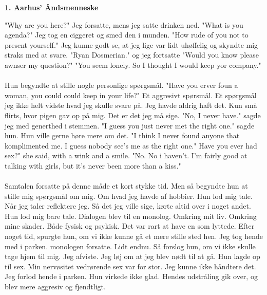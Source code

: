 \documentclass[]{article}
\begin{document}
\begin{center}
	\large\textbf{1. Aarhus' Åndsmenneske}
\end{center}

"Why are you here?" Jeg forsatte, mens jeg satte drinken ned. "What is you agenda?" Jeg tog en ciggeret og smed den i munden. "How rude of you not to present yourself." Jeg kunne godt se, at jeg lige var lidt uhøffelig og skyndte mig straks med at svare. "Ryan Dosmerian." og jeg fortsatte "Would you know please awnser my question?" "You seem lonely. So I thought I would keep yor company." 
\\ \\
Hun begyndte at stille nogle personlige spørgsmål. "Have you erver foun a woman, you could could keep in your life?" Et aggresivt spørsmål. Et spørgsmål jeg ikke helt vidste hvad jeg skulle svare på. Jeg havde aldrig haft det. Kun små flirts, hvor pigen gav op på mig. Det er det jeg må sige. "No, I never have." sagde jeg med generthed i stemmen. "I guess you just never met the right one." sagde hun. Hun ville gerne høre mere om det. "I think I never found anyone that komplimented me. I guess nobody see's me as the right one." Have you ever had sex?" she said, with a wink and a smile. "No. No i haven't. I'm fairly good at talking with girls, but it's never been more than a kiss."
\\ \\
Samtalen forsatte på denne måde et kort stykke tid. Men så begyndte hun at stille mig spørgsmål om mig. Om hvad jeg havde af hobbier. Hun lod mig tale. Når jeg taler reflektere jeg. Så det jeg ville sige, kørte altid over i noget andet. Hun lod mig bare tale. Dialogen blev til en monolog. Omkring mit liv. Omkring mine skader. Både fysisk og psykisk. Det var rart at have en som lyttede. Efter noget tid, spurgte hun, om vi ikke kunne gå et mere stille sted hen. Jeg tog hende med i parken. monologen forsatte. Lidt endnu. Så forslog hun, om vi ikke skulle tage hjem til mig. Jeg afviste. Jeg løj om at jeg blev nødt til at gå. Hun lagde op til sex. Min nervøsitet vedrørende sex var for stor.  Jeg kunne ikke håndtere det. Jeg forlod hende i parken. Hun virkede ikke glad. Hendes udstråling gik over, og blev mere aggresiv og fjendtligt. 
\end{document}
